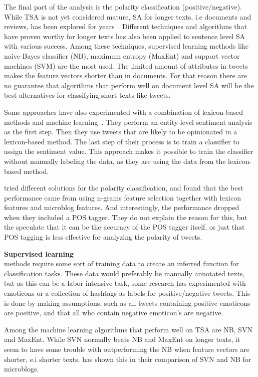The final part of the analysis is the polarity classification (positive/negative). While TSA is not yet considered mature, SA for longer texts, i.e documents and reviews, has been explored for years~\citep{book:pang}. Different techniques and algorithms that have proven worthy for longer texts has also been applied to sentence level SA with various success. Among these techniques, supervised learning methods like naive Bayes classifier (NB), maximum entropy (MaxEnt) and support vector machines (SVM) are the most used. The limited amount of attributes in tweets makes the feature vectors shorter than in documents. For that reason there are no guarantee that algorithms that perform well on document level SA will be the best alternatives for classifying short texts like tweets.

Some approaches have also experimented with a combination of lexicon-based methods and  machine learning~\citep{article:mudinas}. They perform an entity-level sentiment analysis as the first step. Then they use tweets that are likely to be opinionated in a lexicon-based method. The last step of their process is to train a classifier to assign the sentiment value. This approach makes it possible to train the classifier without manually labeling the data, as they are using the data from the lexicon-based method.

\cite{article:omg} tried different solutions for the polarity classification, and found that the best performance came from using n-grams feature selection together with lexicon features and microblog features. And interestingly, the performance dropped when they included a POS tagger. They do not explain the reason for this, but the speculate that it can be the accuracy of the POS tagger itself, or just that POS tagging is less effective for analyzing the polarity of tweets.\vspace{8mm}

\noindent
\textbf{Supervised learning} \\
\noindent
methods require some sort of training data to create an inferred function for classification tasks. These data would preferably be manually annotated texts, but as this can be a labor-intensive task, some research has experimented with emoticons or a collection of hashtags as labels for positive/negative tweets. This is done by making assumptions, such as all tweets containing positive emoticons are positive, and that all who contain negative emoticon’s are negative.

Among the machine learning algorithms that perform well on TSA are NB, SVN and MaxEnt. While SVN normally beats NB and MaxEnt on longer texts, it seem to have some trouble with outperforming the NB when feature vectors are shorter, e.i shorter texts. \cite{article:bermingham} has shown this in their comparison of SVN and NB for microblogs.\vspace{8 mm}

